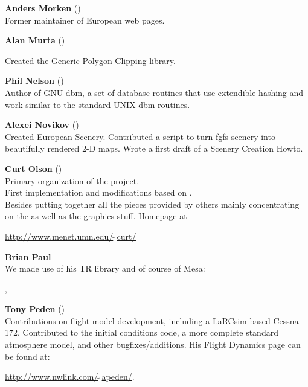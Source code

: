 \noindent \textbf{Anders Morken} ()\\
  Former maintainer of European web pages.
  \medskip

\noindent \textbf{Alan Murta} ()
 \medskip

  Created the Generic Polygon Clipping library.
 \medskip

   \medskip

\noindent \textbf{Phil Nelson} ()\\
  Author of GNU dbm, a set of database routines that use extendible hashing and work
  similar to the standard UNIX dbm routines.
  \medskip

\noindent \textbf{Alexei Novikov}
()\\
  Created European Scenery. Contributed a script to turn fgfs scenery into beautifully rendered
  2-D maps. Wrote a first draft of a Scenery Creation Howto.
  \medskip

\noindent \textbf{Curt Olson} ()\\
 Primary organization of the project.\\
 First implementation and modifications based on .\\
 Besides putting together all the pieces provided by others mainly concentrating on the  as well as the graphics stuff. Homepage at

 \href{http://www.menet.umn.edu/~curt/}{http://www.menet.umn.edu/$\tilde{~~}$curt/}
 \medskip
 
\noindent \textbf{Brian Paul}\\
 We made use of his TR library and of course of Mesa:
 
 , 
 \medskip

\noindent \textbf{Tony Peden}  ()\\
  Contributions on flight model development, including a LaRCsim based
  Cessna 172. Contributed to  {\JSBSim} the initial conditions code, a more complete
  standard atmosphere model, and other bugfixes/additions.
  His Flight Dynamics page can be found at:
   \medskip

  \href{http://www.nwlink.com/~apeden}{http://www.nwlink.com/$\tilde{~~}$apeden/}.
  \medskip


